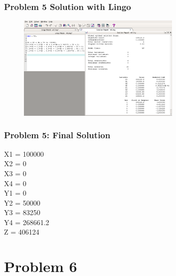 \documentclass[10pt,svgnames,fragile]{beamer}
\begin{document}
\begin{frame}[label={sec:orge9abdcb}]{}
\frametitle{Problem 5 Solution with Lingo }
\begin{figure}
\includegraphics[width=0.7\textwidth]{images/5.png}
\end{figure}
\end{frame}

\begin{frame}[label={sec:org9c62e72}]{}
\frametitle{Problem 5: Final Solution}

X1 = 100000\\
X2 = 0\\
X3 = 0\\
X4 = 0\\
Y1 = 0\\
Y2 = 50000\\
Y3 = 83250\\
Y4 = 268661.2\\
Z = 406124
\end{frame}



\section{Problem 6}
\label{sec:org92dd686}
\end{document}

